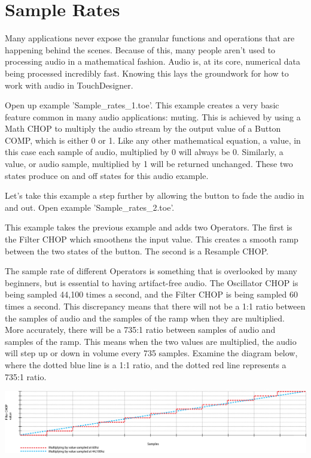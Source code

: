 
\section{Sample Rates}

\begin{fullwidth}
Many applications never expose the granular functions and operations that are happening behind the scenes. Because of this, many people aren't used to processing audio in a mathematical fashion. Audio is, at its core, numerical data being processed incredibly fast. Knowing this lays the groundwork for how to work with audio in TouchDesigner. 

Open up example 'Sample\_rates\_1.toe'. This example creates a very basic feature common in many audio applications: muting. This is achieved by using a Math CHOP to multiply the audio stream by the output value of a Button COMP, which is either 0 or 1. Like any other mathematical equation, a value, in this case each sample of audio, multiplied by 0 will always be 0. Similarly, a value, or audio sample, multiplied by 1 will be returned unchanged. These two states produce on and off states for this audio example.  

Let's take this example a step further by allowing the button to fade the audio in and out. Open example 'Sample\_rates\_2.toe'. 

This example takes the previous example and adds two Operators. The first is the Filter CHOP which smoothens the input value. This creates a smooth ramp between the two states of the button. The second is a Resample CHOP. 

The sample rate of different Operators is something that is overlooked by many beginners, but is essential to having artifact-free audio. The Oscillator CHOP is being sampled 44,100 times a second, and the Filter CHOP is being sampled 60 times a second. This discrepancy means that there will not be a 1:1 ratio between the samples of audio and the samples of the ramp when they are multiplied. More accurately, there will be a 735:1 ratio between samples of audio and samples of the ramp. This means when the two values are multiplied, the audio will step up or down in volume every 735 samples. Examine the diagram below, where the dotted blue line is a 1:1 ratio, and the dotted red line represents a 735:1 ratio.

\begin{center}
\includegraphics{./img/4.4/sample-rate.png}
\end{center}


\end{fullwidth}
